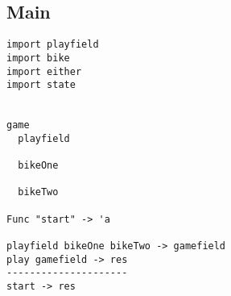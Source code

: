 \subsection{Main}
\begin{lstlisting}
import playfield
import bike
import either
import state


game
  playfield

  bikeOne

  bikeTwo

Func "start" -> 'a

playfield bikeOne bikeTwo -> gamefield
play gamefield -> res
---------------------
start -> res
\end{lstlisting}

